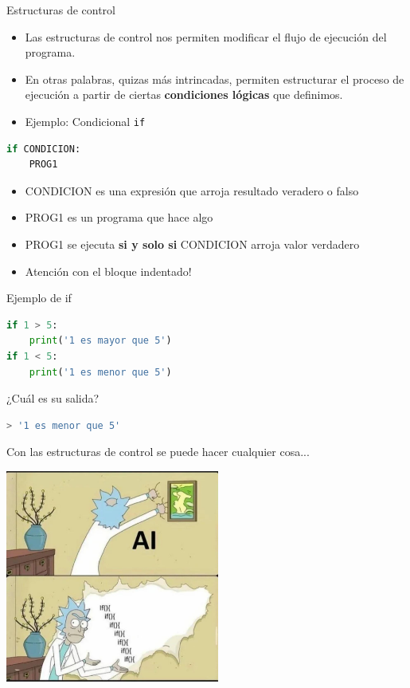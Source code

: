\documentclass{beamer}
\begin{document}
\begin{frame}[fragile]{Estructuras de control} \pause
\begin{itemize}
    \item Las estructuras de control nos permiten  modificar el flujo de ejecución del programa. \pause
    \item En otras palabras, quizas más intrincadas, permiten estructurar el proceso de ejecución a partir de ciertas \textbf{condiciones lógicas} que definimos. \pause
    \item Ejemplo: Condicional \texttt{if} \pause
\end{itemize}

\begin{lstlisting}[language=Python]
if CONDICION:
    PROG1 
\end{lstlisting} \pause

\begin{itemize}
    \item CONDICION es una expresión que arroja resultado veradero o falso
    \item PROG1 es un programa que hace algo
    \item PROG1 se ejecuta \textbf{si y solo si} CONDICION arroja valor verdadero \pause
    \item Atención con el bloque indentado!
\end{itemize}
\end{frame}

\begin{frame}[fragile]{Ejemplo de if}
\begin{lstlisting}[language=Python]
if 1 > 5:
    print('1 es mayor que 5')
if 1 < 5:
    print('1 es menor que 5') 
\end{lstlisting} \pause

¿Cuál es su salida? \pause
\begin{lstlisting}[language=Python]
> '1 es menor que 5'
\end{lstlisting}
\end{frame}

\begin{frame}{Con las estructuras de control se puede hacer cualquier cosa...} \pause
\begin{center}
\includegraphics[height=7cm, scale=0.5]{rick_ai.jpeg}
\end{center}
\end{frame}
\end{document}
